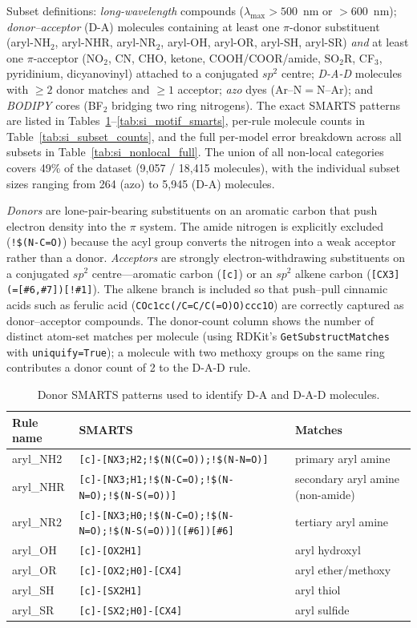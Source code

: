 \documentclass[journal=jcisd8,manuscript=suppinfo]{achemso}
\begin{document}
Subset definitions: \textit{long-wavelength} compounds ($\lambda_{\max} > 500$~nm or $> 600$~nm); \textit{donor--acceptor} (D-A) molecules containing at least one $\pi$-donor substituent (aryl-NH$_2$, aryl-NHR, aryl-NR$_2$, aryl-OH, aryl-OR, aryl-SH, aryl-SR) \emph{and} at least one $\pi$-acceptor (NO$_2$, CN, CHO, ketone, COOH/COOR/amide, SO$_2$R, CF$_3$, pyridinium, dicyanovinyl) attached to a conjugated $sp^2$ centre; \textit{D-A-D} molecules with $\geq 2$ donor matches and $\geq 1$ acceptor; \textit{azo} dyes (Ar--N$=$N--Ar); and \textit{BODIPY} cores (BF$_2$ bridging two ring nitrogens). The exact SMARTS patterns are listed in Tables~\ref{tab:si_donor_smarts}--\ref{tab:si_motif_smarts}, per-rule molecule counts in Table~\ref{tab:si_subset_counts}, and the full per-model error breakdown across all subsets in Table~\ref{tab:si_nonlocal_full}. The union of all non-local categories covers 49\% of the dataset (9{,}057 / 18{,}415 molecules), with the individual subset sizes ranging from 264 (azo) to 5{,}945 (D-A) molecules.

\textit{Donors} are lone-pair-bearing substituents on an aromatic carbon that push electron density into the $\pi$ system. The amide nitrogen is explicitly excluded (\texttt{!\$(N-C=O)}) because the acyl group converts the nitrogen into a weak acceptor rather than a donor.
\textit{Acceptors} are strongly electron-withdrawing substituents on a conjugated $sp^2$ centre---aromatic carbon (\texttt{[c]}) or an $sp^2$ alkene carbon (\texttt{[CX3](=[\#6,\#7])[!\#1]}). The alkene branch is included so that push--pull cinnamic acids such as ferulic acid (\texttt{COc1cc(/C=C/C(=O)O)ccc1O}) are correctly captured as donor--acceptor compounds.
The donor-count column shows the number of distinct atom-set matches per molecule (using RDKit's \texttt{GetSubstructMatches} with \texttt{uniquify=True}); a molecule with two methoxy groups on the same ring contributes a donor count of 2 to the D-A-D rule.

\begin{table}[htbp]
\centering
\caption{Donor SMARTS patterns used to identify D-A and D-A-D molecules.}
\label{tab:si_donor_smarts}
\scriptsize
\begin{tabular}{lll}
\toprule
\textbf{Rule name} & \textbf{SMARTS} & \textbf{Matches} \\
\midrule
aryl\_NH2 & \verb|[c]-[NX3;H2;!$(N(C=O));!$(N-N=O)]| & primary aryl amine \\
aryl\_NHR & \verb|[c]-[NX3;H1;!$(N-C=O);!$(N-N=O);!$(N-S(=O))]| & secondary aryl amine (non-amide) \\
aryl\_NR2 & \verb|[c]-[NX3;H0;!$(N-C=O);!$(N-N=O);!$(N-S(=O))]([#6])[#6]| & tertiary aryl amine \\
aryl\_OH & \verb|[c]-[OX2H1]| & aryl hydroxyl \\
aryl\_OR & \verb|[c]-[OX2;H0]-[CX4]| & aryl ether/methoxy \\
aryl\_SH & \verb|[c]-[SX2H1]| & aryl thiol \\
aryl\_SR & \verb|[c]-[SX2;H0]-[CX4]| & aryl sulfide \\
\bottomrule
\end{tabular}
\end{table}
\end{document}
